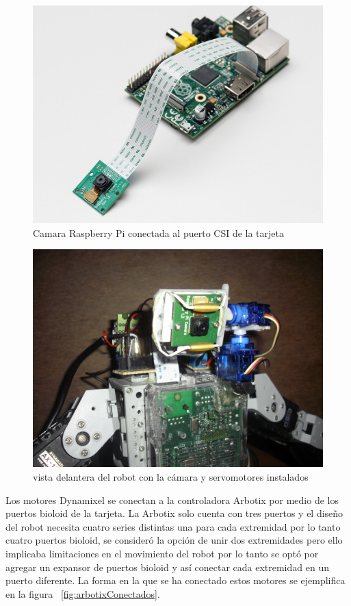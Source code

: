 \begin{figure}[hbtp]
\centering
\includegraphics[scale=0.6]{imagenes/raspbCam.jpg}
\caption{Camara Raspberry Pi conectada al puerto CSI de la tarjeta}
\label{fig:camACSI}
\end{figure}
 
\begin{figure}[hbtp]
\centering
\includegraphics[scale=0.08]{imagenes/servosYcamara.JPG}
\caption{vista delantera del robot con la cámara y servomotores instalados}
\label{fig:servosycam}
\end{figure}

Los motores Dynamixel se conectan a la controladora Arbotix por medio de los puertos bioloid de la tarjeta. La Arbotix solo cuenta con tres puertos y el diseño del robot necesita cuatro series distintas 
una para cada extremidad por lo tanto cuatro puertos bioloid, se consideró la opción de unir dos extremidades pero ello implicaba limitaciones en el movimiento del robot por lo tanto se optó por agregar un expansor de puertos bioloid y así conectar cada extremidad en un puerto diferente. La forma en la que se ha conectado estos motores se ejemplifica en la figura ~\ref{fig:arbotixConectados}. 

